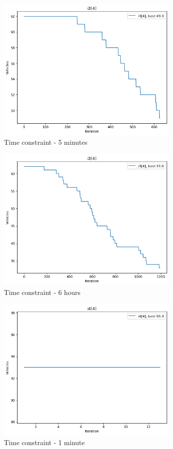 \documentclass{article}
\begin{document}
\begin{figure}
\centering
\includegraphics[width=0.8\textwidth]{i3[4]_5_vehicles.png}
\caption{\label{fig:i3[4]_5_vehicles}Time constraint - 5 minutes}
\end{figure}

\begin{figure}
\centering
\includegraphics[width=0.8\textwidth]{i3[4]_360_vehicles.png}
\caption{\label{fig:i3[42]_360_vehicles}Time constraint - 6 hours}
\end{figure}

\begin{figure}
\centering
\includegraphics[width=0.8\textwidth]{i4[4]_1_vehicles.png}
\caption{\label{fig:i4[4]_1_vehicles}Time constraint - 1 minute}
\end{figure}
\end{document}
